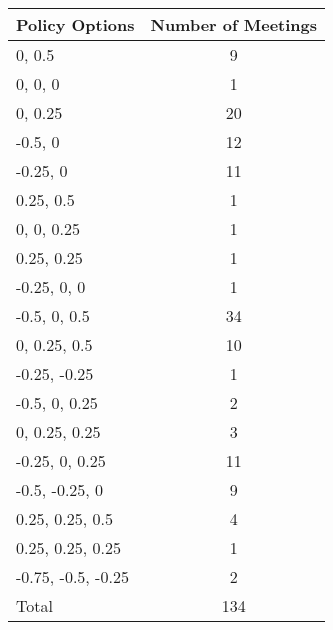 \begin{tabular}{lc}
\hline\hline 
\addlinespace 
Policy Options & Number of Meetings \\ 
\hline 
0, 0.5 & 9 \\
0, 0, 0 & 1 \\
0, 0.25 & 20 \\
-0.5, 0 & 12 \\
-0.25, 0 & 11 \\
0.25, 0.5 & 1 \\
0, 0, 0.25 & 1 \\
0.25, 0.25 & 1 \\
-0.25, 0, 0 & 1 \\
-0.5, 0, 0.5 & 34 \\
0, 0.25, 0.5 & 10 \\
-0.25, -0.25 & 1 \\
-0.5, 0, 0.25 & 2 \\
0, 0.25, 0.25 & 3 \\
-0.25, 0, 0.25 & 11 \\
-0.5, -0.25, 0 & 9 \\
0.25, 0.25, 0.5 & 4 \\
0.25, 0.25, 0.25 & 1 \\
-0.75, -0.5, -0.25 & 2 \\
\addlinespace 
Total & 134 \\
\hline 
\end{tabular}